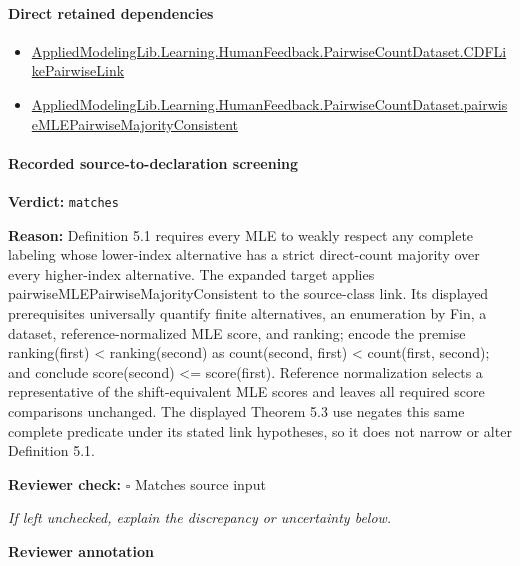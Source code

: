 \documentclass[10pt]{article}
\newcommand{\reviewerbox}{%
  \par\noindent\fbox{\parbox{0.96\linewidth}{\rule{0pt}{0.38in}}}\par
}
\newcommand{\reviewmatch}[1]{%
  \par\noindent\textbf{Reviewer check:} $\square$\; #1\par
  \noindent\emph{If left unchecked, explain the discrepancy or uncertainty below.}\par
}
\begin{document}
\paragraph{Direct retained dependencies}
\begin{itemize}\raggedright
\item \hyperlink{governing-declaration-3449f3559185d0fd}{Applied\allowbreak{}Modeling\allowbreak{}Lib.\allowbreak{}Learning.\allowbreak{}Human\allowbreak{}Feedback.\allowbreak{}Pairwise\allowbreak{}Count\allowbreak{}Dataset.\allowbreak{}CDF\allowbreak{}Like\allowbreak{}Pairwise\allowbreak{}Link}
\item \hyperlink{governing-declaration-65fca57a0eff76f4}{Applied\allowbreak{}Modeling\allowbreak{}Lib.\allowbreak{}Learning.\allowbreak{}Human\allowbreak{}Feedback.\allowbreak{}Pairwise\allowbreak{}Count\allowbreak{}Dataset.\allowbreak{}pairwise\allowbreak{}MLE\allowbreak{}Pairwise\allowbreak{}Majority\allowbreak{}Consistent}
\end{itemize}
\paragraph{Recorded source-to-declaration screening}
\textbf{Verdict:} \texttt{matches}
\\
{\raggedright
\textbf{Reason:} Definition 5.\allowbreak{}1 requires every MLE to weakly respect any complete labeling whose lower-\allowbreak{}index alternative has a strict direct-\allowbreak{}count majority over every higher-\allowbreak{}index alternative.\allowbreak{} The expanded target applies pairwiseMLEPairwiseMajorityConsistent to the source-\allowbreak{}class link.\allowbreak{} Its displayed prerequisites universally quantify finite alternatives, an enumeration by Fin, a dataset, reference-\allowbreak{}normalized MLE score, and ranking;\allowbreak{} encode the premise ranking(first) < ranking(second) as count(second, first) < count(first, second);\allowbreak{} and conclude score(second) <= score(first).\allowbreak{} Reference normalization selects a representative of the shift-\allowbreak{}equivalent MLE scores and leaves all required score comparisons unchanged.\allowbreak{} The displayed Theorem 5.\allowbreak{}3 use negates this same complete predicate under its stated link hypotheses, so it does not narrow or alter Definition 5.\allowbreak{}1.\allowbreak{}
\par}
\reviewmatch{Matches source input}
\noindent\textbf{Reviewer annotation}\par
\reviewerbox
\clearpage
\hypertarget{paper-prerequisite-eddfe1e162a942bc}{}
\end{document}
